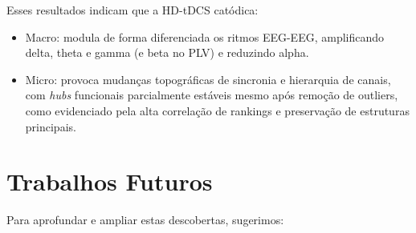 Esses resultados indicam que a HD-tDCS catódica:
\begin{itemize}
  \item Macro: modula de forma diferenciada os ritmos EEG-EEG, amplificando delta, theta e gamma (e beta no PLV) e reduzindo alpha.
  \item Micro: provoca mudanças topográficas de sincronia e hierarquia de canais, com \textit{hubs} funcionais parcialmente estáveis mesmo após remoção de outliers, como evidenciado pela alta correlação de rankings e preservação de estruturas principais.
\end{itemize}

\section{Trabalhos Futuros}
Para aprofundar e ampliar estas descobertas, sugerimos:
